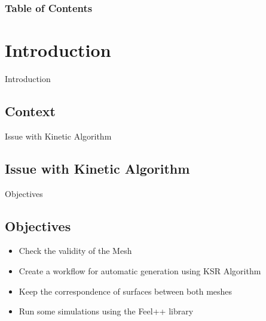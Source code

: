 \documentclass[10pt]{beamer}
\begin{document}
\begin{frame}
    \frametitle{Table of Contents}
    \begin{multicols}{2} %
        \tableofcontents
    \end{multicols}
    \end{frame}


\section{Introduction}
\begin{frame}{Introduction}
    \subsection{Context}
\end{frame}

\begin{frame}{Issue with Kinetic Algorithm}
    \subsection{Issue with Kinetic Algorithm}
\end{frame}

\begin{frame}{Objectives}
    \subsection{Objectives}
    \begin{itemize}
        \item Check the validity of the Mesh
        \item Create a workflow for automatic generation using KSR Algorithm
        \item Keep the correspondence of surfaces between both meshes
        \item Run some simulations using the Feel++ library
    \end{itemize}
\end{frame}
\end{document}

